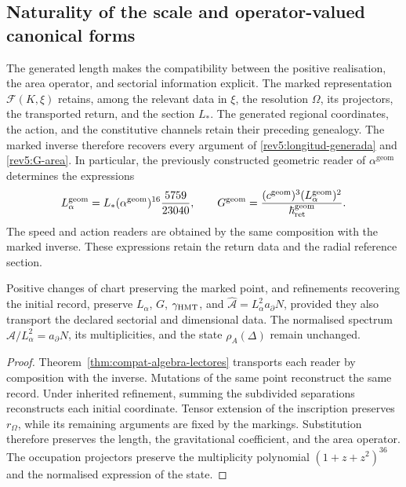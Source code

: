 \subsection{Naturality of the scale and operator-valued canonical forms}
\label{rev5:naturalidad-areal}

The generated length makes the compatibility between the positive
realisation, the area operator, and sectorial information explicit.
The marked representation \(\mathcal F(K,\xi)\) retains,
among the relevant data in \(\xi\), the resolution
\(\Omega\), its projectors, the transported return, and the section
\(L_*\). The generated regional coordinates, the action, and the constitutive
channels retain their preceding genealogy. The marked inverse
therefore recovers every argument of
\eqref{rev5:longitud-generada} and \eqref{rev5:G-area}.
In particular, the previously constructed geometric reader of
\(\alpha^{\mathrm{geom}}\) determines the expressions
\[
 L_\alpha^{\mathrm{geom}}
 =L_*(\alpha^{\mathrm{geom}})^{16}\frac{5759}{23040},
 \qquad
 G^{\mathrm{geom}}
 =\frac{(c^{\mathrm{geom}})^3
 (L_\alpha^{\mathrm{geom}})^2}{\hbar_{\rm ret}^{\mathrm{geom}}}.
\]
The speed and action readers are obtained by the same composition
with the marked inverse. These expressions retain the return data
and the radial reference section.

\begin{corollary}
\label{rev5:conservacion}
Positive changes of chart preserving the marked point, and
refinements recovering the initial record, preserve
\(L_\alpha\), \(G\), \(\gamma_{\rm HMT}\), and
\(\widehat{\mathcal A}=L_\alpha^2a_\partial N\), provided
they also transport the declared sectorial and dimensional data.
The normalised spectrum
\(\widehat{\mathcal A}/L_\alpha^2=a_\partial N\), its
multiplicities, and the state \(\rho_A(\Delta)\) remain unchanged.
\end{corollary}
\begin{proof}
Theorem~\ref{thm:compat-algebra-lectores} transports each reader
by composition with the inverse. Mutations of the same point
reconstruct the same record. Under inherited refinement, summing
the subdivided separations reconstructs each initial coordinate.
Tensor extension of the inscription preserves \(r_\Omega\),
while its remaining arguments are fixed by the markings.
Substitution therefore preserves the length, the gravitational
coefficient, and the area operator. The occupation projectors
preserve the multiplicity polynomial \((1+z+z^2)^{36}\) and
the normalised expression of the state.
\end{proof}

